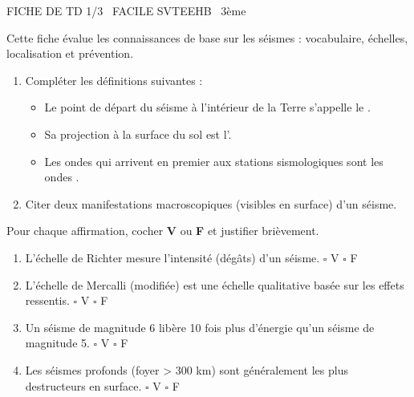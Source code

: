 \documentclass[11pt]{article}
\begin{document}
\begin{tcolorbox}[enhanced,colback=popink,colframe=popink,arc=10pt,boxrule=0pt,left=12pt,right=12pt,top=9pt,bottom=9pt]
{\color{white}\popxbold\small FICHE DE TD 1/3 \textbullet\ FACILE \hfill SVTEEHB \textbullet\ 3ème\par}
\end{tcolorbox}
\vspace{4pt}
Cette fiche évalue les connaissances de base sur les séismes : vocabulaire, échelles, localisation et prévention.

\begin{exercice}
\begin{enumerate}
    \item Compléter les définitions suivantes :
    \begin{itemize}
        \item Le point de départ du séisme à l'intérieur de la Terre s'appelle le \underline{\hspace{4cm}}.
        \item Sa projection à la surface du sol est l'\underline{\hspace{4cm}}.
        \item Les ondes qui arrivent en premier aux stations sismologiques sont les ondes \underline{\hspace{4cm}}.
    \end{itemize}
    \item Citer deux manifestations macroscopiques (visibles en surface) d'un séisme.
\end{enumerate}
\end{exercice}

\begin{exercice}
Pour chaque affirmation, cocher \textbf{V} ou \textbf{F} et justifier brièvement.
\begin{enumerate}
    \item L'échelle de Richter mesure l'intensité (dégâts) d'un séisme. \hfill $\square$ V \quad $\square$ F
    \item L'échelle de Mercalli (modifiée) est une échelle qualitative basée sur les effets ressentis. \hfill $\square$ V \quad $\square$ F
    \item Un séisme de magnitude 6 libère 10 fois plus d'énergie qu'un séisme de magnitude 5. \hfill $\square$ V \quad $\square$ F
    \item Les séismes profonds (foyer > 300 km) sont généralement les plus destructeurs en surface. \hfill $\square$ V \quad $\square$ F
\end{enumerate}
\end{exercice}
\end{document}
